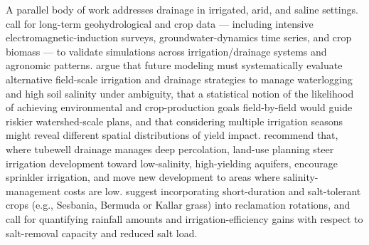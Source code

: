 \documentclass[11pt]{article}
\begin{document}
A parallel body of work addresses drainage in irrigated, arid, and saline settings. \textcite{Yao2017} call for long-term geohydrological and crop data --- including intensive electromagnetic-induction surveys, groundwater-dynamics time series, and crop biomass --- to validate simulations across irrigation/drainage systems and agronomic patterns. \textcite{Alzraiee2013} argue that future modeling must systematically evaluate alternative field-scale irrigation and drainage strategies to manage waterlogging and high soil salinity under ambiguity, that a statistical notion of the likelihood of achieving environmental and crop-production goals field-by-field would guide riskier watershed-scale plans, and that considering multiple irrigation seasons might reveal different spatial distributions of yield impact. \textcite{Bethune2008} recommend that, where tubewell drainage manages deep percolation, land-use planning steer irrigation development toward low-salinity, high-yielding aquifers, encourage sprinkler irrigation, and move new development to areas where salinity-management costs are low. \textcite{Qadir2001} suggest incorporating short-duration and salt-tolerant crops (e.g., Sesbania, Bermuda or Kallar grass) into reclamation rotations, and \textcite{Castanheira2010} call for quantifying rainfall amounts and irrigation-efficiency gains with respect to salt-removal capacity and reduced salt load.
\end{document}
